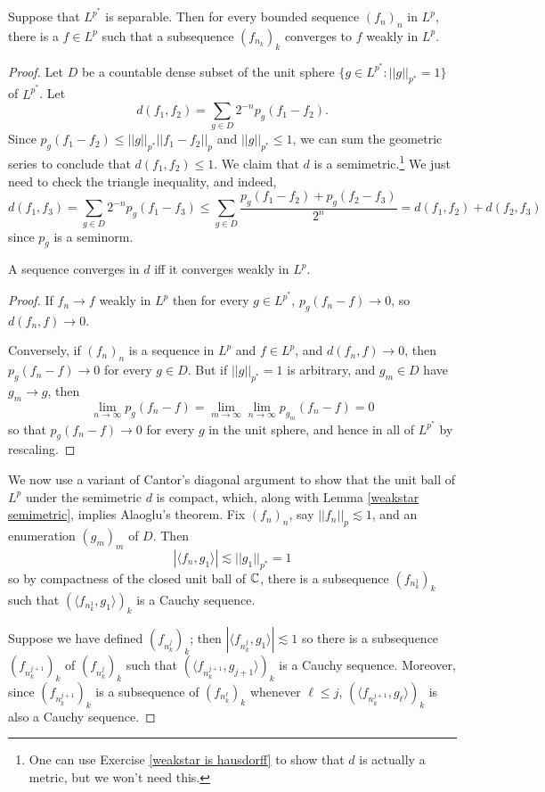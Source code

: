 \begin{theorem}
Suppose that $L^{p^*}$ is separable. Then for every bounded sequence $(f_n)_n$ in $L^p$, there is a $f \in L^p$ such that a subsequence $(f_{n_k})_k$ converges to $f$ weakly in $L^p$.
\end{theorem}
\begin{proof}
Let $D$ be a countable dense subset of the unit sphere $\{g \in L^{p^*}: ||g||_{p^*} = 1\}$ of $L^{p^*}$.
Let
$$d(f_1, f_2) = \sum_{g \in D} 2^{-n} p_g(f_1 - f_2).$$
Since $p_g(f_1 - f_2) \leq ||g||_{p^*} ||f_1 - f_2||_p$ and $||g||_{p^*} \leq 1$, we can sum the geometric series to conclude that $d(f_1, f_2) \leq 1$.
We claim that $d$ is a semimetric.\footnote{One can use Exercise \ref{weakstar is hausdorff} to show that $d$ is actually a metric, but we won't need this.}
We just need to check the triangle inequality, and indeed,
$$d(f_1, f_3) = \sum_{g \in D} 2^{-n} p_g(f_1 - f_3) \leq \sum_{g \in D} \frac{p_g(f_1 - f_2) + p_g(f_2 - f_3)}{2^n} = d(f_1, f_2) + d(f_2, f_3)$$
since $p_g$ is a seminorm.

\begin{lemma}
\label{weakstar semimetric}
A sequence converges in $d$ iff it converges weakly in $L^p$.
\end{lemma}
\begin{proof}
If $f_n \to f$ weakly in $L^p$ then for every $g \in L^{p^*}$, $p_g(f_n - f) \to 0$, so $d(f_n, f) \to 0$.

Conversely, if $(f_n)_n$ is a sequence in $L^p$ and $f \in L^p$, and $d(f_n, f) \to 0$, then $p_g(f_n - f) \to 0$ for every $g \in D$.
But if $||g||_{p^*} = 1$ is arbitrary, and $g_m \in D$ have $g_m \to g$, then
$$\lim_{n \to \infty} p_g(f_n - f) = \lim_{m \to \infty} \lim_{n \to \infty} p_{g_m}(f_n - f) = 0$$
so that $p_g(f_n - f) \to 0$ for every $g$ in the unit sphere, and hence in all of $L^{p^*}$ by rescaling.
\end{proof}

We now use a variant of Cantor's diagonal argument to show that the unit ball of $L^p$ under the semimetric $d$ is compact, which, along with Lemma \ref{weakstar semimetric}, implies Alaoglu's theorem.
Fix $(f_n)_n$, say $||f_n||_p \lesssim 1$, and an enumeration $(g_m)_m$ of $D$.
Then
$$|\langle f_n, g_1\rangle| \lesssim ||g_1||_{p^*} = 1$$
so by compactness of the closed unit ball of $\mathbb{C}$, there is a subsequence $(f_{n_k^1})_k$ such that $(\langle f_{n_k^1}, g_1\rangle)_k$ is a Cauchy sequence.

Suppose we have defined $(f_{n_k^j})_k$; then $|\langle f_{n_k^j}, g_1\rangle| \lesssim 1$ so there is a subsequence $(f_{n_k^{j+1}})_k$ of $(f_{n_k^j})_k$ such that $(\langle f_{n_k^{j+1}}, g_{j+1}\rangle)_k$ is a Cauchy sequence.
Moreover, since $(f_{n_k^{j+1}})_k$ is a subsequence of $(f_{n_k^\ell})_k$ whenever $\ell \leq j$, $(\langle f_{n_k^{j+1}}, g_\ell\rangle)_k$ is also a Cauchy sequence.


\end{proof}

